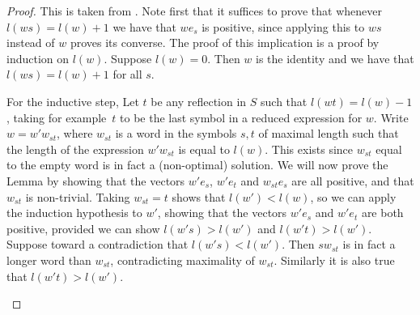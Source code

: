 \documentclass{article}
\theoremstyle{definition}
\begin{document}
\begin{proof}
This is taken from \cite{humphreys1990}. Note first that it suffices to prove that whenever $l(ws) = l(w) + 1$ we have that $we_s$ is positive, since applying this to $ws$ instead of $w$ proves its converse. 
The proof of this implication is a proof by induction on $l(w)$. Suppose $l(w) = 0$. Then $w$ is the identity and we have that $l(ws) = l(w) + 1$ for all $s$. 

For the inductive step, Let $t$ be any reflection in $S$ such that $l(wt) = l(w) - 1$, taking for example~$t$ to be the last symbol in a reduced expression for $w$. Write $w = w'w_{st}$, where $w_{st}$ is a word in the symbols $s, t$ of maximal length such that the length of the expression $w'w_{st}$ is equal to $l(w)$. This exists since $w_{st}$ equal to the empty word is in fact a (non-optimal) solution.
We will now prove the Lemma by showing that the vectors $w'e_s$, $w'e_t$ and $w_{st}e_s$ are all positive, and that $w_{st}$ is non-trivial. Taking $w_{st} = t$ shows that $l(w') < l(w)$, so we can apply the induction hypothesis to $w'$, showing that the vectors $w'e_s$ and $w'e_t$ are both positive, provided we can show $l(w's) > l(w')$ and $l(w't) > l(w')$. 
Suppose toward a contradiction that $l(w's) < l(w')$. Then $sw_{st}$ is in fact a longer word than $w_{st}$, contradicting maximality of $w_{st}$. Similarly it is also true that $l(w't) > l(w')$.


\begin{figure}[ht]
\centering
\begin{minipage}{.5\textwidth}
\centering
{}
\end{minipage}%
\begin{minipage}{.5\textwidth}
\centering

\end{minipage}
\end{figure}
\end{proof}
\end{document}
